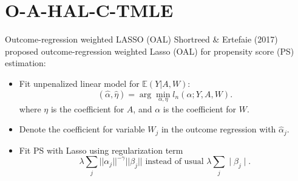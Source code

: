 \documentclass[t]{beamer}
\newlength{\wideitemsep}
\let\olditem\item
\renewcommand{\item}{\setlength{\itemsep}{\wideitemsep}\olditem}
\newcommand{\E}{\mathbb{E}}
\begin{document}
\section{O-A-HAL-C-TMLE}

\begin{frame}{Outcome-regression weighted LASSO (OAL)}
Shortreed \& Ertefaie (2017) proposed outcome-regression weighted Lasso (OAL) for propensity score (PS) estimation:
\begin{itemize}
\item  Fit unpenalized linear model for $\E(Y|A,W)$:
  $$(\hat{\alpha}, \hat{\eta}) = \arg\min_{\alpha,\eta} l_n(\alpha;Y,A,W).$$
where $\eta$ is the coefficient for $A$, and $\alpha$ is the coefficient for $W$.

\item Denote the coefficient for variable $W_j$ in the outcome regression with $\hat{\alpha}_j$.

  \item Fit PS with Lasso using regularization term
    \[\lambda \sum_j ||\alpha_j||^{-\gamma} ||\beta_j || \mbox{ instead of usual $\lambda \sum_j \mid \beta_j\mid$.}\]


\end{itemize}
\end{frame}
\end{document}
